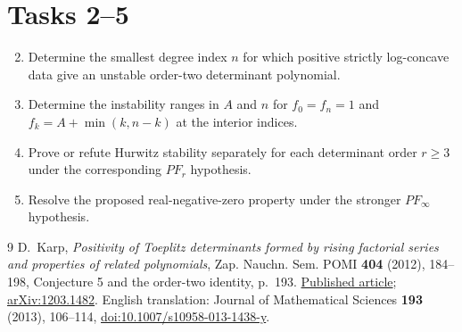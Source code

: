 \documentclass[10pt]{article}
\begin{document}
\section*{Tasks 2--5}

\begin{enumerate}
\setcounter{enumi}{1}
\item Determine the smallest degree index $n$ for which positive strictly
log-concave data give an unstable order-two determinant polynomial.
\item Determine the instability ranges in $A$ and $n$ for
$f_0=f_n=1$ and $f_k=A+\min(k,n-k)$ at the interior indices.
\item Prove or refute Hurwitz stability separately for each determinant
order $r\geq3$ under the corresponding $PF_r$ hypothesis.
\item Resolve the proposed real-negative-zero property under the
stronger $PF_\infty$ hypothesis.
\end{enumerate}

\begin{thebibliography}{9}
D.~Karp, \emph{Positivity of Toeplitz determinants formed by rising
factorial series and properties of related polynomials},
Zap. Nauchn. Sem. POMI \textbf{404} (2012), 184--198,
Conjecture 5 and the order-two identity, p.~193.
\href{https://www.mathnet.ru/eng/znsl5267}{Published article};
\href{https://arxiv.org/abs/1203.1482}{arXiv:1203.1482}.
English translation: Journal of Mathematical Sciences
\textbf{193} (2013), 106--114,
\href{https://doi.org/10.1007/s10958-013-1438-y}
{doi:10.1007/s10958-013-1438-y}.
\end{thebibliography}
\end{document}

